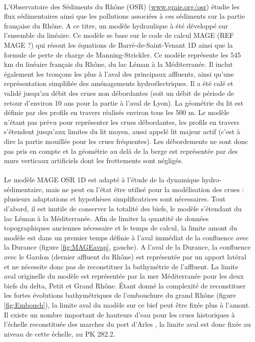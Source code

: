 \documentclass[11pt]{article}
\begin{document}
	 \paragraph{} L'Observatoire des Sédiments du Rhône (OSR) (\url{www.graie.org/osr}) étudie les flux sédimentaires ainsi que les pollutions associées à ces sédiments sur la partie française du Rhône. A ce titre, un modèle hydraulique à été développé sur l'ensemble du linéaire. Ce modèle se base sur le code de calcul MAGE (REF MAGE ?) qui résout les équations de Barré-de-Saint-Venant 1D ainsi que la formule de perte de charge de Manning-Strickler. Ce modèle représente les 545 km du linéaire français du Rhône, du lac Léman à la Méditerranée. Il inclut également les tronçons les plus à l'aval des principaux affluents, ainsi qu'une représentation simplifiée des aménagements hydroélectriques. Il a été calé et validé jusqu'au débit des crues non débordantes (soit un débit de période de retour d'environ 10 ans pour la partie à l'aval de Lyon). La géométrie du lit est définie par des profils en travers réalisés environ tous les 500 m. Le modèle n'étant pas prévu pour représenter les crues débordantes, les profils en travers s'étendent jusqu'aux limites du lit moyen, aussi appelé lit majeur actif (c'est à dire la partie mouillée pour les crues fréquentes). Les débordements ne sont donc pas pris en compte et la géométrie au delà de la berge est représentée par des murs verticaux artificiels dont les frottements sont négligés. 
	 
	 \paragraph{} Le modèle MAGE OSR 1D est adapté à l'étude de la dynamique hydro-sédimentaire, mais ne peut en l'état être utilisé pour la modélisation des crues : plusieurs adaptations et hypothèses simplificatrices sont nécessaires. Tout d'abord, il est inutile de conserver la totalité des biefs, le modèle s'étendant du lac Léman à la Méditerranée. Afin de limiter la quantité de données topographiques anciennes nécessaire et le temps de calcul, la limite amont du modèle est dans un premier temps définie à l'aval immédiat de la confluence avec la Durance (figure \ref{fig:MAGEavap}, gauche). A l'aval de la Durance, la confluence avec le Gardon (dernier affluent du Rhône) est représentée par un apport latéral et ne nécessite donc pas de reconstituer la bathymétrie de l'affluent. La limite aval originelle du modèle est représentée par la mer Méditerranée pour les deux biefs du delta, Petit et Grand Rhône. Étant donné la complexité de reconstituer les fortes évolutions bathymétriques de l'embouchure du grand Rhône (figure \ref{fig:Embouch}), la limite aval du modèle sur ce bief peut être fixée plus à l'amont. Il existe un nombre important de hauteurs d'eau pour les crues historiques à l'échelle reconstituée des marches du port d'Arles \citep{pichard_les_1995}, la limite aval est donc fixée au niveau de cette échelle, au PK 282.2. 
	
\end{document}
